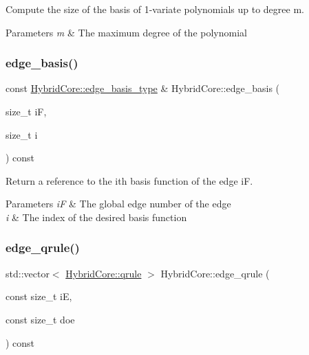 Compute the size of the basis of 1-\/variate polynomials up to degree m. 


\begin{DoxyParams}{Parameters}
{\em m} & The maximum degree of the polynomial \\
\hline
\end{DoxyParams}
\mbox{\label{classHArDCore2D_1_1HybridCore_a6b4feaeef7739a2e30fcf6c601fcf721}} 
\subsubsection{\texorpdfstring{edge\+\_\+basis()}{edge\_basis()}}
{\footnotesize\ttfamily const \hyperlink{classHArDCore2D_1_1HybridCore_a1f2030ea16722179fd3523e6e6675948}{Hybrid\+Core\+::edge\+\_\+basis\+\_\+type} \& Hybrid\+Core\+::edge\+\_\+basis (\begin{DoxyParamCaption}\item[{size\+\_\+t}]{iF,  }\item[{size\+\_\+t}]{i }\end{DoxyParamCaption}) const}



Return a reference to the i\textquotesingle{}th basis function of the edge iF. 


\begin{DoxyParams}{Parameters}
{\em iF} & The global edge number of the edge \\
\hline
{\em i} & The index of the desired basis function \\
\hline
\end{DoxyParams}
\mbox{\label{classHArDCore2D_1_1HybridCore_a448297d0d0afefe477815dfb7821b270}} 
\subsubsection{\texorpdfstring{edge\+\_\+qrule()}{edge\_qrule()}}
{\footnotesize\ttfamily std\+::vector$<$ \hyperlink{structHArDCore2D_1_1HybridCore_1_1qrule}{Hybrid\+Core\+::qrule} $>$ Hybrid\+Core\+::edge\+\_\+qrule (\begin{DoxyParamCaption}\item[{const size\+\_\+t}]{iE,  }\item[{const size\+\_\+t}]{doe }\end{DoxyParamCaption}) const}



